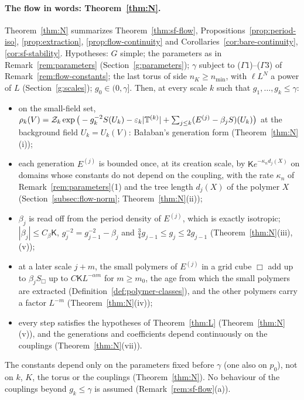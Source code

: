 \paragraph{The flow in words: Theorem~\ref{thm:N}.} Theorem~\ref{thm:N} summarizes Theorem~\ref{thm:sf-flow}, Propositions~\ref{prop:period-iso}, \ref{prop:extraction}, \ref{prop:flow-continuity} and Corollaries~\ref{cor:bare-continuity}, \ref{cor:sf-stability}. Hypotheses: $G$ simple; the parameters as in Remark~\ref{rem:parameters} (Section~\ref{g:parameters}); $\gamma$ subject to ($\Gamma$1)--($\Gamma$3) of Remark~\ref{rem:flow-constants}; the last torus of side $n_K\ge n_{\min}$, with $\ell L^N$ a power of $L$ (Section~\ref{g:scales}); $g_0\in(0,\gamma]$. Then, at every scale $k$ such that $g_1,\dots,g_k\le\gamma$:
\begin{itemize}
\item on the small-field set, $\rho_k(V)=\mathcal Z_k\exp\big(-g_k^{-2}S(U_k)-\varepsilon_k|\mathbb T^{(k)}|+\sum_{j\le k}(E^{(j)}-\beta_jS)(U_k)\big)$ at the background field $U_k=U_k(V)$: Ba\l aban's generation form (Theorem~\ref{thm:N}(i));
\item each generation $E^{(j)}$ is bounded once, at its creation scale, by $\mathsf Ke^{-\kappa_nd_j(X)}$ on domains whose constants do not depend on the coupling, with the rate $\kappa_n$ of Remark~\ref{rem:parameters}(1) and the tree length $d_j(X)$ of the polymer $X$ (Section~\ref{subsec:flow-norm}; Theorem~\ref{thm:N}(ii));
\item $\beta_j$ is read off from the period density of $E^{(j)}$, which is exactly isotropic; $|\beta_j|\le C_\beta\mathsf K$, $g_j^{-2}=g_{j-1}^{-2}-\beta_j$ and $\frac34g_{j-1}\le g_j\le2g_{j-1}$ (Theorem~\ref{thm:N}(iii), (v));
\item at a later scale $j+m$, the small polymers of $E^{(j)}$ in a grid cube $\Box$ add up to $\beta_jS_\Box$ up to $C\mathsf KL^{-\alpha m}$ for $m\ge m_0$, the age from which the small polymers are extracted (Definition~\ref{def:polymer-classes}), and the other polymers carry a factor $L^{-m}$ (Theorem~\ref{thm:N}(iv));
\item every step satisfies the hypotheses of Theorem~\ref{thm:L} (Theorem~\ref{thm:N}(v)), and the generations and coefficients depend continuously on the couplings (Theorem~\ref{thm:N}(vii)).
\end{itemize}
The constants depend only on the parameters fixed before $\gamma$ (one also on $p_0$), not on $k$, $K$, the torus or the couplings (Theorem~\ref{thm:N}). No behaviour of the couplings beyond $g_k\le\gamma$ is assumed (Remark~\ref{rem:sf-flow}(a)).

